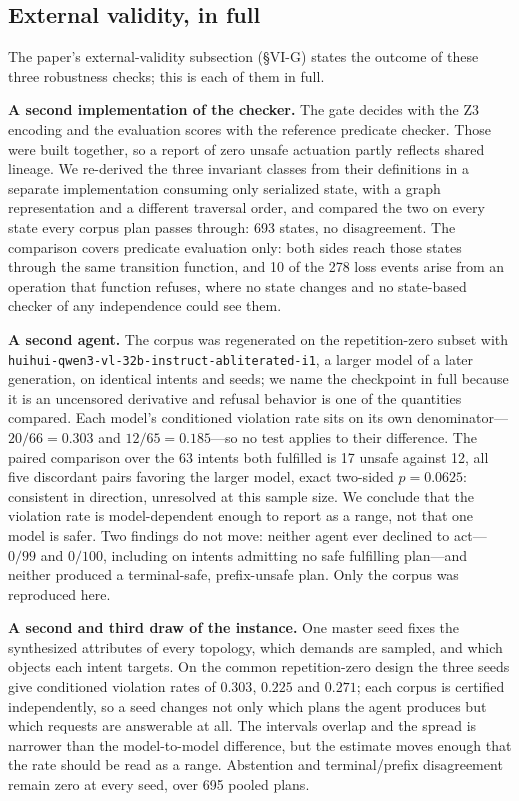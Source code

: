 \subsection{External validity, in full}
\label{supp:validity}

The paper's external-validity subsection (\S VI-G) states the outcome of
these three robustness checks; this is each of them in full.

\textbf{A second implementation of the checker.} The gate decides with the
Z3 encoding and the evaluation scores with the reference predicate checker.
Those were built together, so a report of zero unsafe actuation partly
reflects shared lineage. We re-derived the three invariant classes from their
definitions in a separate implementation consuming only serialized state,
with a graph representation and a different traversal order, and compared the
two on every state every corpus plan passes through: 693 states, no
disagreement. The comparison covers predicate evaluation only: both sides
reach those states through the same transition function, and 10 of the 278
loss events arise from an operation that function refuses, where no state
changes and no state-based checker of any independence could see them.

\textbf{A second agent.} The corpus was regenerated on the repetition-zero
subset with
\texttt{huihui-qwen3-vl-32b-\allowbreak instruct-\allowbreak abliterated-i1},
a larger model of a later generation, on identical intents and seeds; we name
the checkpoint in full because it is an uncensored derivative and refusal
behavior is one of the quantities compared. Each model's conditioned
violation rate sits on its own denominator---$20/66=0.303$ and
$12/65=0.185$---so no test applies to their difference. The paired comparison
over the 63 intents both fulfilled is 17 unsafe against 12, all five
discordant pairs favoring the larger model, exact two-sided $p=0.0625$:
consistent in direction, unresolved at this sample size. We conclude that the
violation rate is model-dependent enough to report as a range, not that one
model is safer. Two findings do not move: neither agent ever declined to
act---$0/99$ and $0/100$, including on intents admitting no safe fulfilling
plan---and neither produced a terminal-safe, prefix-unsafe plan. Only the
corpus was reproduced here.

\textbf{A second and third draw of the instance.} One master seed fixes the
synthesized attributes of every topology, which demands are sampled, and
which objects each intent targets. On the common repetition-zero design the
three seeds give conditioned violation rates of $0.303$, $0.225$ and
$0.271$; each corpus is certified independently, so a seed changes not only
which plans the agent produces but which requests are answerable at all. The
intervals overlap and the spread is narrower than the model-to-model
difference, but the estimate moves enough that the rate should be read as a
range. Abstention and terminal/prefix disagreement remain zero at every seed,
over 695 pooled plans.


